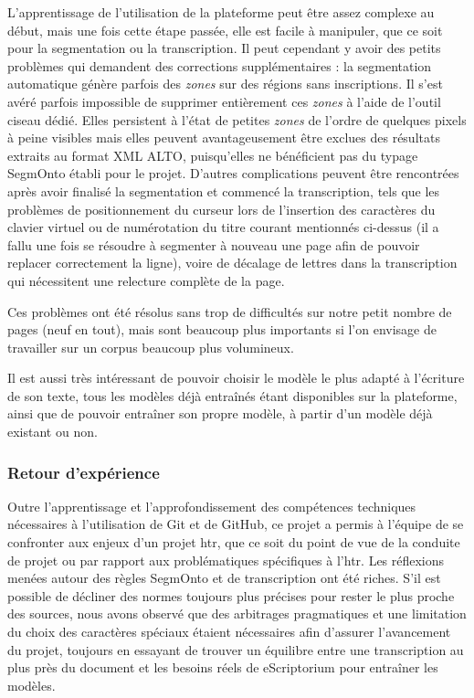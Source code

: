 \documentclass{article}
\begin{document}
	L’apprentissage de l’utilisation de la plateforme peut être assez complexe au début, mais une fois cette étape passée, elle est facile à manipuler, que ce soit pour la segmentation ou la transcription. Il peut cependant y avoir des petits problèmes qui demandent des corrections supplémentaires : la segmentation automatique génère parfois des \textit{zones} sur des régions sans inscriptions. Il s'est avéré parfois impossible de supprimer entièrement ces \textit{zones} à l'aide de l'outil ciseau dédié. Elles persistent à l'état de petites \textit{zones} de l'ordre de quelques pixels à peine visibles mais elles peuvent avantageusement être exclues des résultats extraits au format XML ALTO, puisqu'elles ne bénéficient pas du typage SegmOnto établi pour le projet. D'autres complications peuvent être rencontrées après avoir finalisé la segmentation et commencé la transcription, tels que les problèmes de positionnement du curseur lors de l’insertion des caractères du clavier virtuel ou de numérotation du titre courant mentionnés ci-dessus (il a fallu une fois se résoudre à segmenter à nouveau une page afin de pouvoir replacer correctement la ligne), voire de décalage de lettres dans la transcription qui nécessitent une relecture complète de la page. 
	
	Ces problèmes ont été résolus sans trop de difficultés sur notre petit nombre de pages (neuf en tout), mais sont beaucoup plus importants si l’on envisage de travailler sur un corpus beaucoup plus volumineux.
	
	Il est aussi très intéressant de pouvoir choisir le modèle le plus adapté à l’écriture de son texte, tous les modèles déjà entraînés étant disponibles sur la plateforme, ainsi que de pouvoir entraîner son propre modèle, à partir d’un modèle déjà existant ou non.
	
	\subsubsection{Retour d'expérience}
	Outre l'apprentissage et l'approfondissement des compétences techniques nécessaires à l'utilisation de Git et de GitHub, ce projet a permis à l'équipe de se confronter aux enjeux d'un projet \gls{htr}, que ce soit du point de vue de la conduite de projet ou par rapport aux problématiques spécifiques à l'\gls{htr}. Les réflexions menées autour des règles SegmOnto et de transcription ont été riches. S'il est possible de décliner des normes toujours plus précises pour rester le plus proche des sources, nous avons observé que des arbitrages pragmatiques et une limitation du choix des caractères spéciaux étaient nécessaires afin d'assurer l'avancement du projet, toujours en essayant de trouver un équilibre entre une transcription au plus près du document et les besoins réels de eScriptorium pour entraîner les modèles.
	
\end{document}
